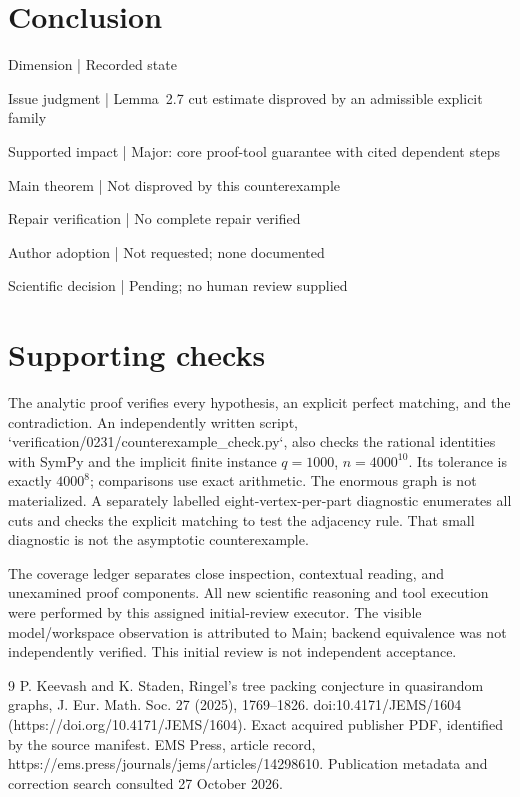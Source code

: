 \documentclass[10pt]{article}
\begin{document}
\section*{Conclusion}
Dimension | Recorded state\par
Issue judgment | Lemma 2.7 cut estimate disproved by an admissible explicit family\par
Supported impact | Major: core proof-tool guarantee with cited dependent steps\par
Main theorem | Not disproved by this counterexample\par
Repair verification | No complete repair verified\par
Author adoption | Not requested; none documented\par
Scientific decision | Pending; no human review supplied\par
\section*{Supporting checks}
The analytic proof verifies every hypothesis, an explicit perfect matching, and the contradiction. An independently written script, `verification/0231/counterexample\_check.py`, also checks the rational identities with SymPy and the implicit finite instance \(q=1000\), \(n=4000^{10}\). Its tolerance is exactly \(4000^8\); comparisons use exact arithmetic. The enormous graph is not materialized. A separately labelled eight-vertex-per-part diagnostic enumerates all cuts and checks the explicit matching to test the adjacency rule. That small diagnostic is not the asymptotic counterexample.\par
The coverage ledger separates close inspection, contextual reading, and unexamined proof components. All new scientific reasoning and tool execution were performed by this assigned initial-review executor. The visible model/workspace observation is attributed to Main; backend equivalence was not independently verified. This initial review is not independent acceptance.\par
9 P. Keevash and K. Staden, Ringel’s tree packing conjecture in quasirandom graphs, J. Eur. Math. Soc. 27 (2025), 1769–1826. doi:10.4171/JEMS/1604 (https://doi.org/10.4171/JEMS/1604). Exact acquired publisher PDF, identified by the source manifest. EMS Press, article record, https://ems.press/journals/jems/articles/14298610. Publication metadata and correction search consulted 27 October 2026.\par
\end{document}
